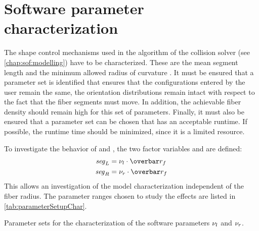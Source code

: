 \section{Software parameter characterization}\label{sec:modelSetup}
%
The shape control mechanisms used in the algorithm of the collision solver  (see \cref{chap:sof:modelling}) have to be characterized.
These are the mean segment length \segLength{} and the minimum allowed radius of curvature \segRadius{}.
It must be ensured that a parameter set is identified that ensures that the configurations entered by the user remain the same, \ie{} the orientation distributions remain intact with respect to the fact that the fiber segments must move.
In addition, the achievable fiber density should remain high for this set of parameters.
Finally, it must also be ensured that a parameter set can be chosen that has an acceptable runtime.
If possible, the runtime time should be minimized, since it is a limited resource.
\par
%
To investigate the behavior of \segLength{} and \segRadius{}, the two factor variables \segLengthFactor{} and \segRadiusFactor{} are defined:
\begin{align}
    \begin{split}
        \segLength &= \segLengthFactor \cdot \fiberRadiusMean\\
        \segRadius &= \segRadiusFactor \cdot \fiberRadiusMean
    \end{split}
\end{align}
This allows an investigation of the model characterization independent of the fiber radius.
The parameter ranges chosen to study the effects are listed in \cref{tab:parameterSetupChar}.
%
\begin{table}[!b]
%
\centering
{}
\caption{Parameter sets for the characterization of the software parameters $\textnormal{$\nu_{l}$}$ and $\textnormal{$\nu_{r}$}$.}
\label{tab:parameterSetupChar}
\end{table}
